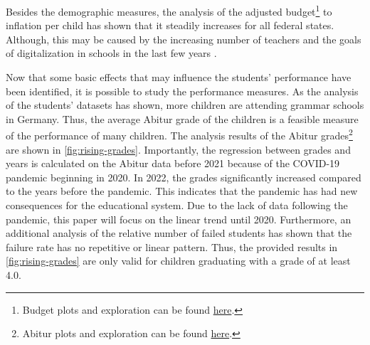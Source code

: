 
Besides the demographic measures, the analysis of the adjusted budget\footnote{\label{footnote:budget}Budget plots and exploration can be found \href{https://github.com/KarylReyne/DataLiteracyWS23/blob/main/exp/TF-007-SchoolBudgets.ipynb}{here}.} to inflation per child has shown that it steadily increases for all federal states. Although, this may be caused by the increasing number of teachers and the goals of digitalization in schools in the last few years \cite{cone_pandemic_2022}.

Now that some basic effects that may influence the students' performance have been identified, it is possible to study the performance measures. As the analysis of the students' datasets has shown, more children are attending grammar schools in Germany. Thus, the average Abitur grade of the children is a feasible measure of the performance of many children. The analysis results of the Abitur grades\footnote{\label{footnote:abi}Abitur plots and exploration can be found \href{https://github.com/KarylReyne/DataLiteracyWS23/blob/main/exp/TF-001-ExploreABIGrades.ipynb}{here}.} are shown in \autoref{fig:rising-grades}. Importantly, the regression between grades and years is calculated on the Abitur data before 2021 because of the COVID-19 pandemic beginning in 2020. In 2022, the grades significantly increased compared to the years before the pandemic. This indicates that the pandemic has had new consequences for the educational system. Due to the lack of data following the pandemic, this paper will focus on the linear trend until 2020. Furthermore, an additional analysis of the relative number of failed students has shown that the failure rate has no repetitive or linear pattern. Thus, the provided results in \autoref{fig:rising-grades} are only valid for children graduating with a grade of at least 4.0.

